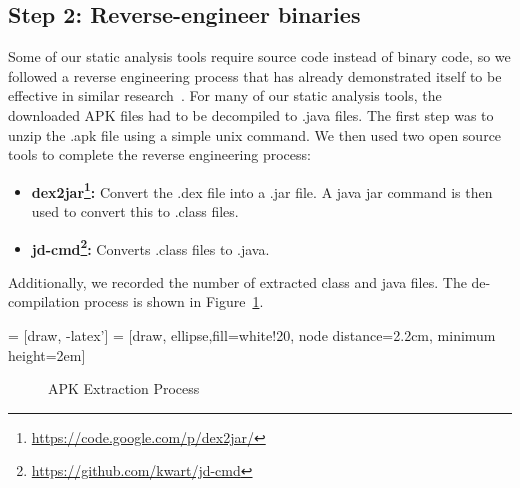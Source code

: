 \documentclass{sig-alternate}
\begin{document}
\subsection{Step 2: Reverse-engineer binaries}
\label{sec: decompliation}
Some of our static analysis tools require source code instead of binary code, so we followed a reverse engineering process that has already demonstrated itself to be effective in similar research~\cite{Lee_2013,6687155}. For many of our static analysis tools, the downloaded APK files had to be decompiled to .java files. The first step was to unzip the .apk file using a simple unix command. We then used two open source tools to complete the reverse engineering process:

\begin{itemize}
    \setlength{\itemsep}{0pt} %
    \setlength{\parskip}{0pt} %
    \setlength{\parsep}{0pt}  %

  \item \textbf{dex2jar\footnote{\url{https://code.google.com/p/dex2jar/}}:} Convert the .dex file into a .jar file. A java jar command is then used to convert this to .class files.
  \item \textbf{jd-cmd\footnote{\url{https://github.com/kwart/jd-cmd}}:} Converts .class files to .java.
\end{itemize}

Additionally, we recorded the number of extracted class and java files. The de-compilation process is shown in Figure~\ref{fig:extractionprocess}.




 = [draw, -latex']
 = [draw, ellipse,fill=white!20, node distance=2.2cm,
    minimum height=2em]

	\begin{figure}[h]
	\begin{center}

\caption{APK Extraction Process}
\label{fig:extractionprocess}
\end{center}
\end{figure}
\end{document}
